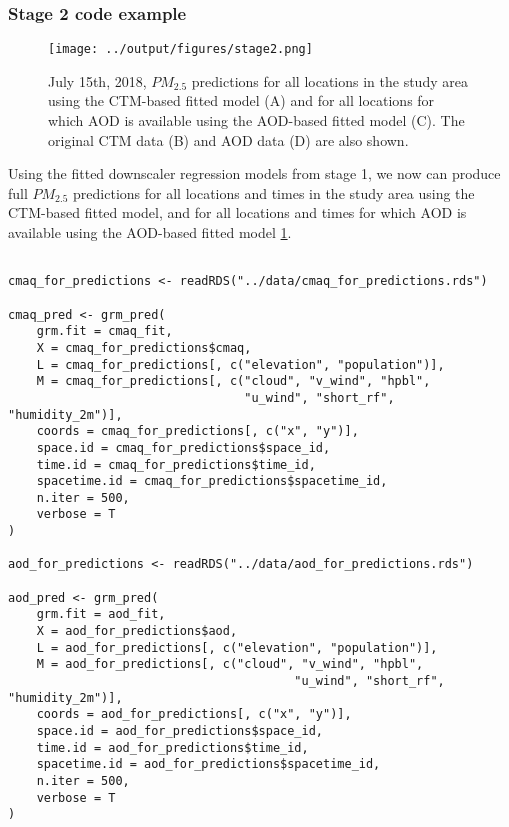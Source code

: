 \documentclass[12pt]{article}
\begin{document}
\subsubsection*{Stage 2 code example}

\begin{figure}[ht]
    \centering
    \texttt{[image: ../output/figures/stage2.png]}
    \caption{July 15th, 2018,  $PM_{2.5}$ predictions for all locations in the study area using the CTM-based fitted model (A) and for all locations for which AOD is available using the AOD-based fitted model (C). The original CTM data (B) and AOD data (D) are also shown.}
    \label{fig:stage2}
\end{figure}

Using the fitted downscaler regression models from stage 1, we now can produce full $PM_2.5$ predictions for all locations and times in the study area using the CTM-based fitted model, and for all locations and times for which AOD is available using the AOD-based fitted model \ref{fig:stage2}.



\begin{lstlisting}

cmaq_for_predictions <- readRDS("../data/cmaq_for_predictions.rds")

cmaq_pred <- grm_pred(
    grm.fit = cmaq_fit,
    X = cmaq_for_predictions$cmaq,
    L = cmaq_for_predictions[, c("elevation", "population")],
    M = cmaq_for_predictions[, c("cloud", "v_wind", "hpbl",
                                 "u_wind", "short_rf", "humidity_2m")],
    coords = cmaq_for_predictions[, c("x", "y")],
    space.id = cmaq_for_predictions$space_id,
    time.id = cmaq_for_predictions$time_id,
    spacetime.id = cmaq_for_predictions$spacetime_id,
    n.iter = 500,
    verbose = T
)

aod_for_predictions <- readRDS("../data/aod_for_predictions.rds")

aod_pred <- grm_pred(
    grm.fit = aod_fit,
    X = aod_for_predictions$aod,
    L = aod_for_predictions[, c("elevation", "population")],
    M = aod_for_predictions[, c("cloud", "v_wind", "hpbl", 
                                        "u_wind", "short_rf", "humidity_2m")],
    coords = aod_for_predictions[, c("x", "y")],
    space.id = aod_for_predictions$space_id,
    time.id = aod_for_predictions$time_id,
    spacetime.id = aod_for_predictions$spacetime_id,
    n.iter = 500,
    verbose = T
)


\end{lstlisting}
\end{document}
